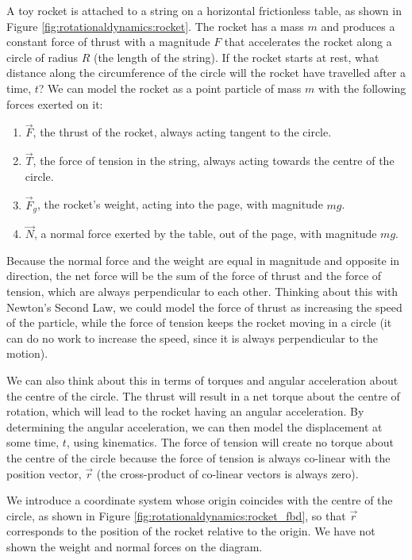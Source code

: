 \begin{example}{ A toy rocket is attached to a string on a horizontal frictionless table, as shown in Figure \ref{fig:rotationaldynamics:rocket}. The rocket has a mass $m$ and produces a constant force of thrust with a magnitude $F$ that accelerates the rocket along a circle of radius $R$ (the length of the string). If the rocket starts at rest, what distance along the circumference of the circle will the rocket have travelled after a time, $t$?}
We can model the rocket as a point particle of mass $m$ with the following forces exerted on it:
\begin{enumerate}
\item $\vec F$, the thrust of the rocket, always acting tangent to the circle.
\item $\vec T$, the force of tension in the string, always acting towards the centre of the circle.
\item $\vec F_g$, the rocket's weight, acting into the page, with magnitude $mg$.
\item $\vec N$, a normal force exerted by the table, out of the page, with magnitude $mg$.
\end{enumerate}
Because the normal force and the weight are equal in magnitude and opposite in direction, the net force will be the sum of the force of thrust and the force of tension, which are always perpendicular to each other. Thinking about this with Newton's Second Law, we could model the force of thrust as increasing the speed of the particle, while the force of tension keeps the rocket moving in a circle (it can do no work to increase the speed, since it is always perpendicular to the motion).

We can also think about this in terms of torques and angular acceleration about the centre of the circle. The thrust will result in a net torque about the centre of rotation, which will lead to the rocket having an angular acceleration. By determining the angular acceleration, we can then model the displacement at some time, $t$, using kinematics. The force of tension will create no torque about the centre of the circle because the force of tension is always co-linear with the position vector, $\vec r$ (the cross-product of co-linear vectors is always zero).

We introduce a coordinate system whose origin coincides with the centre of the circle, as shown in Figure \ref{fig:rotationaldynamics:rocket_fbd}, so that $\vec r$ corresponds to the position of the rocket relative to the origin. We have not shown the weight and normal forces on the diagram. 


\end{example}
